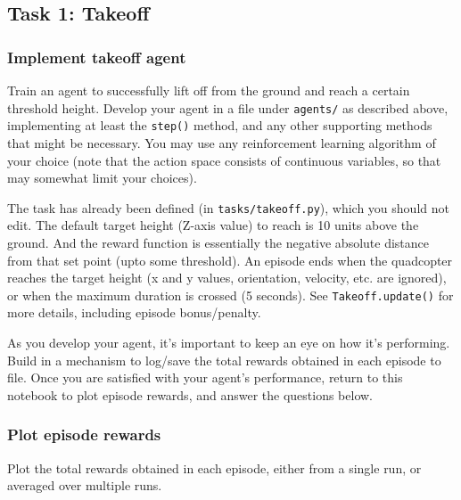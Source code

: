 \documentclass[11pt]{article}
\begin{document}
    \subsection{Task 1: Takeoff}\label{task-1-takeoff}

\subsubsection{Implement takeoff agent}\label{implement-takeoff-agent}

Train an agent to successfully lift off from the ground and reach a
certain threshold height. Develop your agent in a file under
\texttt{agents/} as described above, implementing at least the
\texttt{step()} method, and any other supporting methods that might be
necessary. You may use any reinforcement learning algorithm of your
choice (note that the action space consists of continuous variables, so
that may somewhat limit your choices).

The task has already been defined (in \texttt{tasks/takeoff.py}), which
you should not edit. The default target height (Z-axis value) to reach
is 10 units above the ground. And the reward function is essentially the
negative absolute distance from that set point (upto some threshold). An
episode ends when the quadcopter reaches the target height (x and y
values, orientation, velocity, etc. are ignored), or when the maximum
duration is crossed (5 seconds). See \texttt{Takeoff.update()} for more
details, including episode bonus/penalty.

As you develop your agent, it's important to keep an eye on how it's
performing. Build in a mechanism to log/save the total rewards obtained
in each episode to file. Once you are satisfied with your agent's
performance, return to this notebook to plot episode rewards, and answer
the questions below.

\subsubsection{Plot episode rewards}\label{plot-episode-rewards}

Plot the total rewards obtained in each episode, either from a single
run, or averaged over multiple runs.
\end{document}

